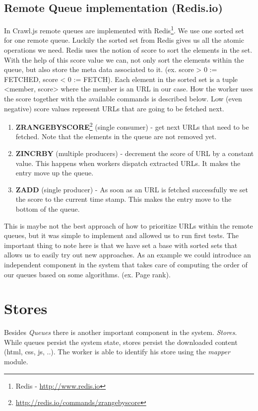 \subsection{Remote Queue implementation (Redis.io)}
In Crawl.js remote queues are implemented with Redis\footnote{Redis - \url{http://www.redis.io}}. We use one sorted set for one remote queue. Luckily the sorted set from Redis gives us all the atomic operations we need. Redis uses the notion of score to sort the elements in the set. With the help of this score value we can, not only sort the elements within the queue, but also store the meta data associated to it. (ex. score > 0 := FETCHED, score < 0 := FETCH). Each element in the sorted set is a tuple <member, score> where the member is an URL in our case. How the worker uses the score together with the available commands is described below. Low (even negative) score values represent URLs that are going to be fetched next.

\begin{enumerate}
  \item \textbf{ZRANGEBYSCORE}\footnote{\url{http://redis.io/commands/zrangebyscore}} (single consumer) - get next URLs that need to be fetched. Note that the elements in the queue are not removed yet.
  \item \textbf{ZINCRBY} (multiple producers) - decrement the score of URL by a constant value. This happens when workers dispatch extracted URLs. It makes the entry move up the queue.
  \item \textbf{ZADD} (single producer) - As soon as an URL is fetched successfully we set the score to the current time stamp. This makes the entry move to the bottom of the queue.
\end{enumerate}

This is maybe not the best approach of how to prioritize URLs within the remote queues, but it was simple to implement and allowed us to run first tests. The important thing to note here is that we have set a base with sorted sets that allows us to easily try out new approaches. As an example we could introduce an independent component in the system that takes care of computing the order of our queues based on some algorithms. (ex. Page rank).

\section{Stores}
Besides \emph{Queues} there is another important component in the system. \emph{Stores}. While queues persist the system state, stores persist the downloaded content (html, css, js, ..). The worker is able to identify his store using the \emph{mapper} module.
